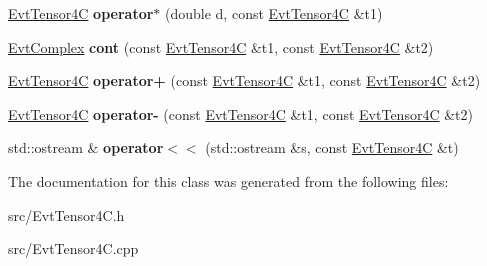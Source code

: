 \begin{DoxyCompactItemize}
\item 
\hypertarget{class_evt_tensor4_c_ad223537886e38e0e42464926c2f16177}{}\hyperlink{class_evt_tensor4_c}{Evt\+Tensor4\+C} {\bfseries operator$\ast$} (double d, const \hyperlink{class_evt_tensor4_c}{Evt\+Tensor4\+C} \&t1)\label{class_evt_tensor4_c_ad223537886e38e0e42464926c2f16177}

\item 
\hypertarget{class_evt_tensor4_c_a24c3a1bccb8166484aeb109f1a627359}{}\hyperlink{class_evt_complex}{Evt\+Complex} {\bfseries cont} (const \hyperlink{class_evt_tensor4_c}{Evt\+Tensor4\+C} \&t1, const \hyperlink{class_evt_tensor4_c}{Evt\+Tensor4\+C} \&t2)\label{class_evt_tensor4_c_a24c3a1bccb8166484aeb109f1a627359}

\item 
\hypertarget{class_evt_tensor4_c_a7ae3e6878ffb98ca6123a8ed0a0fc02d}{}\hyperlink{class_evt_tensor4_c}{Evt\+Tensor4\+C} {\bfseries operator+} (const \hyperlink{class_evt_tensor4_c}{Evt\+Tensor4\+C} \&t1, const \hyperlink{class_evt_tensor4_c}{Evt\+Tensor4\+C} \&t2)\label{class_evt_tensor4_c_a7ae3e6878ffb98ca6123a8ed0a0fc02d}

\item 
\hypertarget{class_evt_tensor4_c_a06b290681f0dd3c872a1fa0280883b05}{}\hyperlink{class_evt_tensor4_c}{Evt\+Tensor4\+C} {\bfseries operator-\/} (const \hyperlink{class_evt_tensor4_c}{Evt\+Tensor4\+C} \&t1, const \hyperlink{class_evt_tensor4_c}{Evt\+Tensor4\+C} \&t2)\label{class_evt_tensor4_c_a06b290681f0dd3c872a1fa0280883b05}

\item 
\hypertarget{class_evt_tensor4_c_a7483e5f2b39d2d8b4dd8060eeab2d099}{}std\+::ostream \& {\bfseries operator$<$$<$} (std\+::ostream \&s, const \hyperlink{class_evt_tensor4_c}{Evt\+Tensor4\+C} \&t)\label{class_evt_tensor4_c_a7483e5f2b39d2d8b4dd8060eeab2d099}

\end{DoxyCompactItemize}


The documentation for this class was generated from the following files\+:\begin{DoxyCompactItemize}
\item 
src/Evt\+Tensor4\+C.\+h\item 
src/Evt\+Tensor4\+C.\+cpp\end{DoxyCompactItemize}
